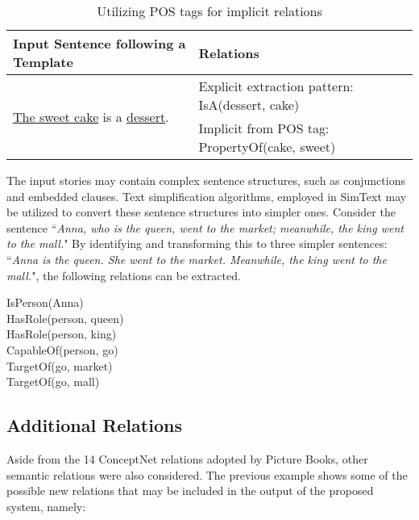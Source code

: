 \begin{table}[ht]   %
\centering
\caption{Utilizing POS tags for implicit relations} \vspace{0.25em}
\begin{tabular}{|l|p{6cm}|} \hline
Input Sentence following a Template & Relations \\ \hline
\multirow{2}{*}{\underline{The sweet cake} is a \underline{dessert}.} & Explicit extraction pattern: IsA(dessert, cake) \\
 & Implicit from POS tag: PropertyOf(cake, sweet) \\ \hline
\end{tabular}
\label{tab:utilizeposforimplicit}
\end{table}

The input stories may contain complex sentence structures, such as conjunctions and embedded clauses. Text simplification algorithms, employed in SimText \cite{Damay:2007} may be utilized to convert these sentence structures into simpler ones. Consider the sentence ``\textit{Anna, who is the queen, went to the market; meanwhile, the king went to the mall.}" By identifying and transforming this to three simpler sentences: ``\textit{Anna is the queen. She went to the market. Meanwhile, the king went to the mall.}", the following relations can be extracted. 

\noindent
	\hspace{1 in}IsPerson(Anna) \\
	\hspace*{1 in}HasRole(person, queen) \\
	\hspace*{1 in}HasRole(person, king) \\
	\hspace*{1 in}CapableOf(person, go) \\
	\hspace*{1 in}TargetOf(go, market) \\
	\hspace*{1 in}TargetOf(go, mall)
	
\subsection{Additional Relations}
\label{sec:addrelations}
	
Aside from the 14 ConceptNet relations adopted by Picture Books, other semantic relations were also considered. The previous example shows some of the possible new relations that may be included in the output of the proposed system, namely:

